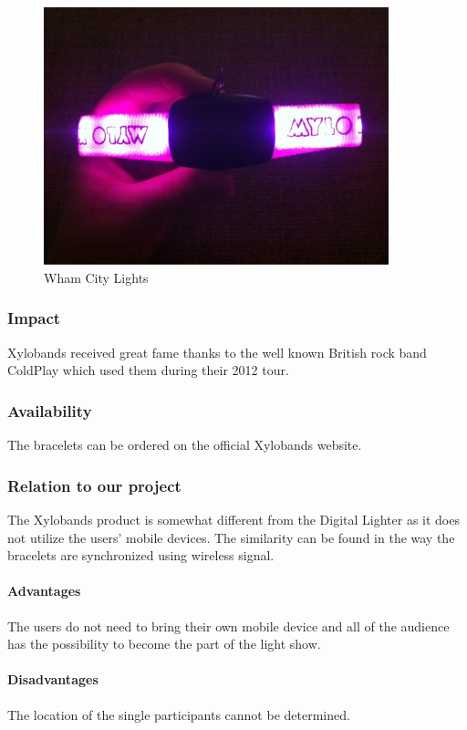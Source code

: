 \begin{figure}[!t]
	\centering
		\includegraphics[width=10cm]{preliminaryStudies/xylo.jpg}
	\caption{Wham City Lights}
	\label{fig:xylo}
\end{figure}

\subsubsection{Impact}
Xylobands received great fame thanks to the well known British rock band ColdPlay which used them during their 2012 tour.

\subsubsection{Availability}
The bracelets can be ordered on the official Xylobands website.

\subsubsection{Relation to our project}
The Xylobands product is somewhat different from the Digital Lighter as it does not utilize the users' mobile devices. 
The similarity can be found in the way the bracelets are synchronized using wireless signal. 

\paragraph{Advantages}
The users do not need to bring their own mobile device and all of the audience has the possibility to become the part of the light show.

\paragraph{Disadvantages}
The location of the single participants cannot be determined.


